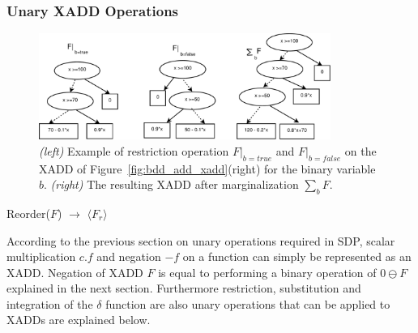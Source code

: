 \documentclass[twoside,11pt]{article}
\begin{document}
\subsubsection{Unary XADD Operations}
\begin{figure}[t!]
\centering
\includegraphics[width=0.85\textwidth]{pics/restriction.pdf}

\caption{%
{\it (left)} Example of restriction operation $F|_{b=true}$ and $F|_{b=false}$ on the XADD of Figure~\ref{fig:bdd_add_xadd}(right) for the binary variable $b$. {\it (right)} The resulting XADD after marginalization $\sum_{b}F$.}
\label{fig:restrict}
\end{figure}
\incmargin{0.5em}
\linesnumbered
\begin{algorithm}[t!]
\dontprintsemicolon

\BlankLine
{}
\caption{{\sc Reorder}($F$) $\longrightarrow$ $\langle F_r \rangle$ \label{alg:reorder}}
\end{algorithm}
\decmargin{0.5em}
According to the previous section on unary operations required in SDP, scalar multiplication $c.f$ and negation $- f$ on a function can simply be represented as an XADD. Negation of XADD $F$ is equal to performing a binary operation of $0 \ominus F$ explained in the next section. Furthermore restriction, substitution and integration of the $\delta$ function are also unary operations that can be applied to XADDs are explained below.  
\end{document}
